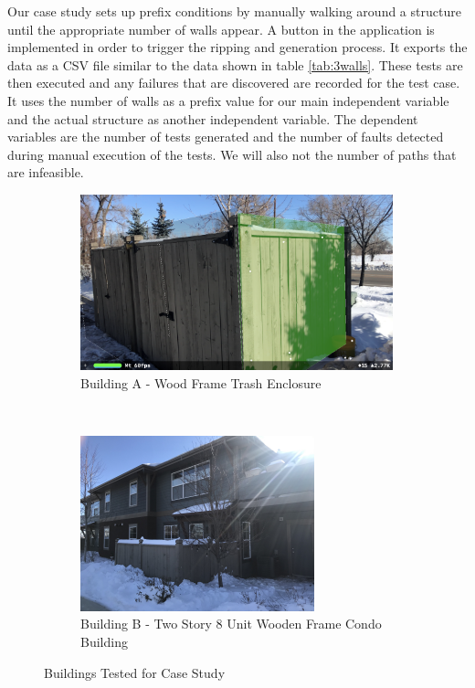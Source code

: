 \documentclass[final,3p]{CSP}
\begin{document}
Our case study sets up prefix conditions by manually walking around a structure until the appropriate number of walls appear.  A button in the application is implemented in order to trigger the ripping and generation process.  It exports the data as a CSV file similar to the data shown in table \ref{tab:3walls}.   These tests are then executed and any failures that are discovered are recorded for the test case.  It uses the number of walls as a prefix value for our main independent variable and the actual structure as another independent variable.  The dependent variables are the number of tests generated and the number of faults detected during manual execution of the tests.  We will also not the number of paths that are infeasible.

\begin{figure}[t!]
    \centering
    \begin{subfigure}[t]{0.6\textwidth}
        \centering
        \includegraphics[height=2.0in]{building-a.PNG}
        \caption{Building A - Wood Frame Trash Enclosure}
        \label{fig:blda}
    \end{subfigure}%
    ~ 
    \begin{subfigure}[t]{0.4\textwidth}
        \centering
        \includegraphics[height=2.0in]{building-b.jpg}
        \caption{Building B - Two Story 8 Unit Wooden Frame Condo Building}
        \label{fig:bldb}
    \end{subfigure}
    \caption{Buildings Tested for Case Study}
\end{figure}
\end{document}
